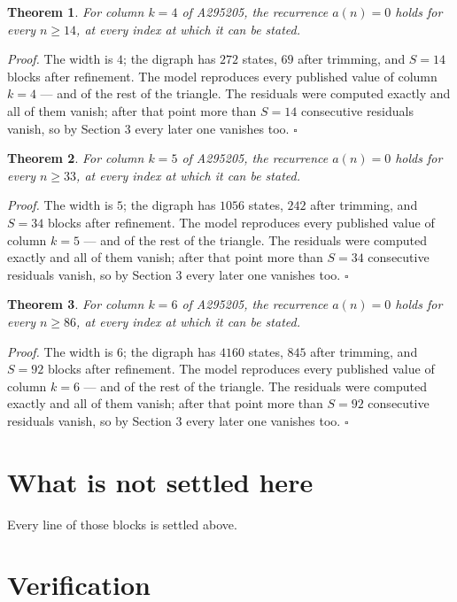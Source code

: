 \documentclass[11pt]{article}
\newtheorem{theorem}{Theorem}
\theoremstyle{definition}
\begin{document}
\begin{theorem} For column $k = 4$ of A295205, the recurrence $a(n) = 0$ holds for every $n \ge 14$, at every index at which it can be stated.\end{theorem}

{\itshape Proof.} The width is $4$; the digraph has $272$ states, $69$ after trimming, and $S = 14$ blocks after refinement. The model reproduces every published value of column $k = 4$ --- and of the rest of the triangle. The residuals were computed exactly and all of them vanish; after that point more than $S = 14$ consecutive residuals vanish, so by Section 3 every later one vanishes too. $\square$

\begin{theorem} For column $k = 5$ of A295205, the recurrence $a(n) = 0$ holds for every $n \ge 33$, at every index at which it can be stated.\end{theorem}

{\itshape Proof.} The width is $5$; the digraph has $1056$ states, $242$ after trimming, and $S = 34$ blocks after refinement. The model reproduces every published value of column $k = 5$ --- and of the rest of the triangle. The residuals were computed exactly and all of them vanish; after that point more than $S = 34$ consecutive residuals vanish, so by Section 3 every later one vanishes too. $\square$

\begin{theorem} For column $k = 6$ of A295205, the recurrence $a(n) = 0$ holds for every $n \ge 86$, at every index at which it can be stated.\end{theorem}

{\itshape Proof.} The width is $6$; the digraph has $4160$ states, $845$ after trimming, and $S = 92$ blocks after refinement. The model reproduces every published value of column $k = 6$ --- and of the rest of the triangle. The residuals were computed exactly and all of them vanish; after that point more than $S = 92$ consecutive residuals vanish, so by Section 3 every later one vanishes too. $\square$

\section{What is not settled here}

Every line of those blocks is settled above.

\section{Verification}
\end{document}
